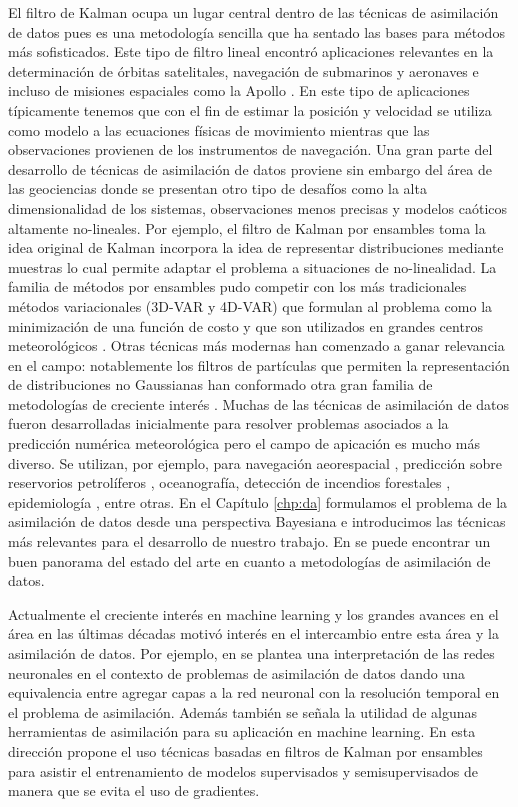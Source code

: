 El filtro de Kalman \citep{Kalman1960, Kalman1961} ocupa un lugar central dentro de las técnicas de asimilación de datos pues es una metodología sencilla que ha sentado las bases para métodos más sofisticados. Este tipo de filtro lineal encontró aplicaciones relevantes en la determinación de órbitas satelitales, navegación de submarinos y aeronaves e incluso de misiones espaciales como la Apollo \citep{Jazwinski1970}. En este tipo de aplicaciones típicamente tenemos que con el fin de estimar la posición y velocidad se utiliza como modelo a las ecuaciones físicas de movimiento mientras que las observaciones provienen de los instrumentos de navegación. Una gran parte del desarrollo de técnicas de asimilación de datos proviene sin embargo del área de las geociencias donde se presentan otro tipo de desafíos como la alta dimensionalidad de los sistemas, observaciones menos precisas y modelos caóticos altamente no-lineales. Por ejemplo, el filtro de Kalman por ensambles \citep{Evensen1994} toma la idea original de Kalman incorpora la idea de representar distribuciones mediante muestras lo cual permite adaptar el problema a situaciones de no-linealidad. La familia de métodos por ensambles pudo competir con los más tradicionales métodos variacionales (3D-VAR y 4D-VAR) que formulan al problema como la minimización de una función de costo y que son utilizados en grandes centros meteorológicos \citep{Kalnay2007}. Otras técnicas más modernas han comenzado a ganar relevancia en el campo: notablemente los filtros de partículas que permiten la representación de distribuciones no Gaussianas han conformado otra gran familia de metodologías de creciente interés \citep{vanLeeuwen2019}. Muchas de las técnicas de asimilación de datos fueron desarrolladas inicialmente para resolver problemas asociados a la predicción numérica meteorológica pero el campo de apicación es mucho más diverso. Se utilizan, por ejemplo, para navegación aeorespacial \cite{Grewal2010}, predicción sobre reservorios petrolíferos \cite{Aanonsen2009}, oceanografía, detección de incendios forestales \citep{Mandel2008}, epidemiología \citep{Shaman2012}, entre otras. En el Capítulo \ref{chp:da} formulamos el problema de la asimilación de datos desde una perspectiva Bayesiana e introducimos las técnicas más relevantes para el desarrollo de nuestro trabajo. En \cite{Carrassi2018} se puede encontrar un buen panorama del estado del arte en cuanto a metodologías de asimilación de datos.

Actualmente el creciente interés en machine learning y los grandes avances en el área en las últimas décadas motivó interés en el intercambio entre esta área y la asimilación de datos. Por ejemplo, en \cite{Abarbanel2018} se plantea una interpretación de las redes neuronales en el contexto de  problemas de asimilación de datos dando una equivalencia entre agregar capas a la red neuronal con la resolución temporal en el problema de asimilación. Además también se señala la utilidad de algunas herramientas de asimilación para su aplicación en machine learning. En esta dirección \cite{Kovachki2019} propone el uso técnicas basadas en filtros de Kalman por ensambles para asistir el entrenamiento de modelos supervisados y semisupervisados de manera que se evita el uso de gradientes.


